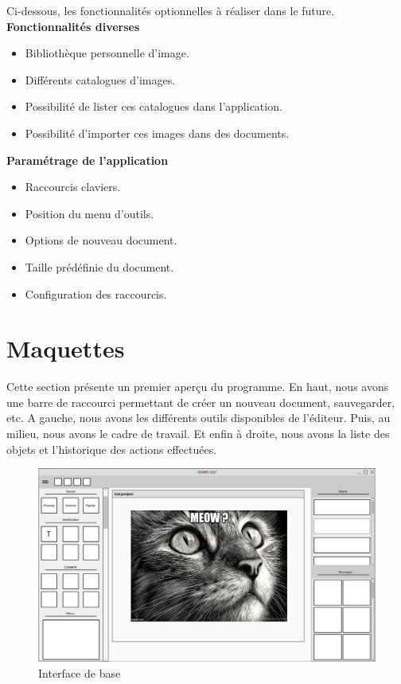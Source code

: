 \documentclass[11pt, a4paper, french]{article}
\begin{document}
		Ci-dessous, les fonctionnalités optionnelles à réaliser dans le future.\\
		
			\textbf{Fonctionnalités diverses}
			\begin{itemize}[label=\textbullet]
				\item Bibliothèque personnelle d’image.
				\item Différents catalogues d’images.
				\item Possibilité de lister ces catalogues dans l’application.
				\item Possibilité d’importer ces images dans des documents. \\
			\end{itemize}
		
			\textbf{Paramétrage de l’application}
			\begin{itemize}[label=\textbullet]
				\item Raccourcis claviers.
				\item Position du menu d’outils.
				\item Options de nouveau document.
				\item Taille prédéfinie du document.
				\item Configuration des raccourcis. \\
			\end{itemize}
			
	
	\pagebreak
	\section{Maquettes}
	
		Cette section présente un premier aperçu du programme. En haut, nous avons une barre de raccourci permettant de créer un nouveau document, sauvegarder, etc. A gauche, nous avons les différents outils disponibles de l'éditeur. Puis, au milieu, nous avons le cadre de travail. Et enfin à droite, nous avons la liste des objets et l'historique des actions effectuées.\\
	
		\begin{figure}[h!] 
			\centering
			\graphicspath{{Mockups/}}
			\includegraphics[scale=0.3]{home_page.png}
			\caption{\label{étiquette} Interface de base}
		\end{figure}
	
\end{document}
